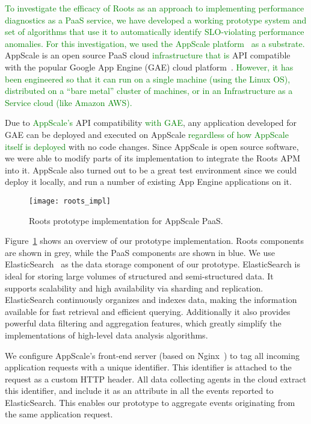 \textcolor{green}{To investigate the efficacy of Roots as an approach to
implementing performance diagnostics as a PaaS service, we have developed a
working prototype system and set of algorithms that use it to automatically
identify SLO-violating performance anomalies.
For this investigation, we used the 
AppScale
platform~\cite{6488671} as a substrate.} AppScale is an open source PaaS cloud
\textcolor{green}{infrastructure that is} API compatible
with the popular Google App Engine (GAE) cloud platform~\cite{gae}.  
\textcolor{green}{However, it has been engineered so that it can run on a
single machine (using the Linux OS), distributed on a ``bare metal'' cluster
of machines, or in an Infrastructure as a Service cloud (like Amazon AWS).}

Due to \textcolor{green}{AppScale's}
API compatibility \textcolor{green}{with GAE}, any application developed for GAE can be deployed and
executed on AppScale \textcolor{green}{regardless of how AppScale itself is
deployed} with no code changes. Since AppScale is open source
software, we were able to modify parts of its implementation to integrate the
Roots APM into it. AppScale also turned out to be a great test environment
since we could deploy it locally, and run a number of existing App Engine
applications on it.

\begin{figure}
\centering
\texttt{[image: roots\_impl]}
\caption{Roots prototype implementation for AppScale PaaS.}
\label{fig:roots_impl}
\end{figure}

Figure~\ref{fig:roots_impl} shows an overview of our prototype implementation. Roots components
are shown in grey, while the PaaS components are shown in blue.
We use ElasticSearch~\cite{elasticsearch} as the data storage component of our prototype. ElasticSearch is ideal 
for storing large volumes of structured and semi-structured data. It supports scalability and 
high availability via sharding and replication.
ElasticSearch continuously organizes and indexes data, making the information available 
for fast retrieval and efficient querying. Additionally it also provides
powerful data filtering and aggregation features, which greatly simplify the implementations of high-level
data analysis algorithms.

We configure AppScale's front-end server (based on Nginx~\cite{XXX}) to tag all incoming application requests
with a unique identifier. This identifier is attached to the request as a custom HTTP header.
All data collecting agents in the cloud extract this identifier, and include it as an attribute
in all the events reported to ElasticSearch. This enables our prototype to aggregate events originating
from the same application request.

